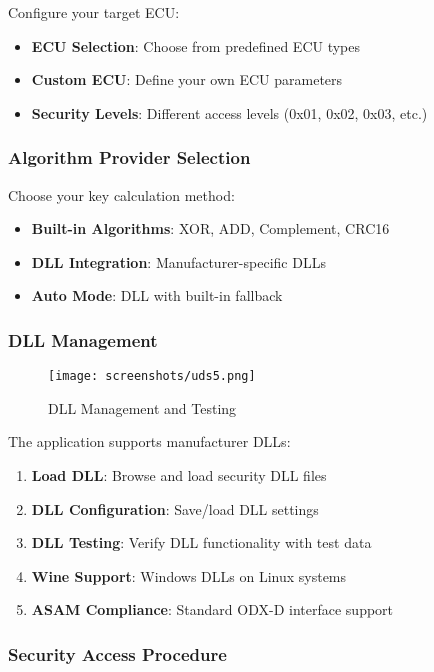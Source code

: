 \documentclass[11pt,a4paper]{article}
\begin{document}
Configure your target ECU:
\begin{itemize}
    \item \textbf{ECU Selection}: Choose from predefined ECU types
    \item \textbf{Custom ECU}: Define your own ECU parameters
    \item \textbf{Security Levels}: Different access levels (0x01, 0x02, 0x03, etc.)
\end{itemize}

\subsubsection{Algorithm Provider Selection}

Choose your key calculation method:
\begin{itemize}
    \item \textbf{Built-in Algorithms}: XOR, ADD, Complement, CRC16
    \item \textbf{DLL Integration}: Manufacturer-specific DLLs
    \item \textbf{Auto Mode}: DLL with built-in fallback
\end{itemize}

\subsubsection{DLL Management}

\begin{figure}[H]
    \centering
    \texttt{[image: screenshots/uds5.png]}
    \caption{DLL Management and Testing}
    \label{fig:uds5}
\end{figure}

The application supports manufacturer DLLs:

\begin{enumerate}
    \item \textbf{Load DLL}: Browse and load security DLL files
    \item \textbf{DLL Configuration}: Save/load DLL settings
    \item \textbf{DLL Testing}: Verify DLL functionality with test data
    \item \textbf{Wine Support}: Windows DLLs on Linux systems
    \item \textbf{ASAM Compliance}: Standard ODX-D interface support
\end{enumerate}

\subsubsection{Security Access Procedure}
\end{document}
